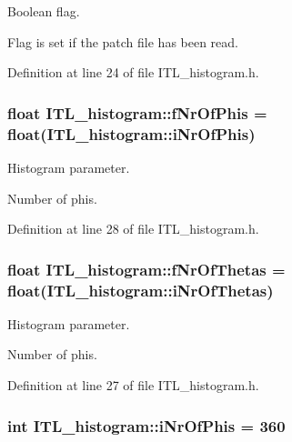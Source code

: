 Boolean flag. 

Flag is set if the patch file has been read. 

Definition at line 24 of file ITL\_\-histogram.h.

\hypertarget{classITL__histogram_adb7718f57d485c9cb69c4dc91ead14ad}{
\subsubsection[{fNrOfPhis}]{\setlength{\rightskip}{0pt plus 5cm}float {\bf ITL\_\-histogram::fNrOfPhis} = float({\bf ITL\_\-histogram::iNrOfPhis})}}
\label{classITL__histogram_adb7718f57d485c9cb69c4dc91ead14ad}


Histogram parameter. 

Number of phis. 

Definition at line 28 of file ITL\_\-histogram.h.

\hypertarget{classITL__histogram_a693544af37d885b4b52316fd27f0c8af}{
\subsubsection[{fNrOfThetas}]{\setlength{\rightskip}{0pt plus 5cm}float {\bf ITL\_\-histogram::fNrOfThetas} = float({\bf ITL\_\-histogram::iNrOfThetas})}}
\label{classITL__histogram_a693544af37d885b4b52316fd27f0c8af}


Histogram parameter. 

Number of phis. 

Definition at line 27 of file ITL\_\-histogram.h.

\hypertarget{classITL__histogram_ac58c7bb82ec5d99ae86223e414d34c26}{
\subsubsection[{iNrOfPhis}]{\setlength{\rightskip}{0pt plus 5cm}int {\bf ITL\_\-histogram::iNrOfPhis} = 360}}
\label{classITL__histogram_ac58c7bb82ec5d99ae86223e414d34c26}


